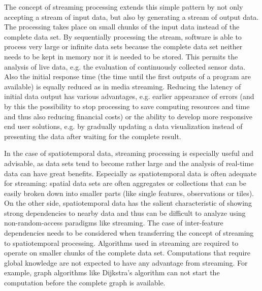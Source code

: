 	The concept of streaming processing extends this simple pattern by not only accepting a stream of input data, but also by generating a stream of output data. The processing takes place on small chunks of the input data instead of the complete data set. By sequentially processing the stream, software is able to process very large or infinite data sets because the complete data set neither needs to be kept in memory nor it is needed to be stored. This permits the analysis of live data, e.g. the evaluation of continuously collected sensor data. Also the initial response time (the time until the first outputs of a program are available) is equally reduced as in media streaming. Reducing the latency of initial data output has various advantages, e.g. earlier appearance of errors (and by this the possibility to stop processing to save computing resources and time and thus also reducing financial costs) or the ability to develop more responsive end user solutions, e.g. by gradually updating a data visualization instead of presenting the data after waiting for the complete result.

	In the case of spatiotemporal data, streaming processing is especially useful and advisable, as data sets tend to become rather large and the analysis of real-time data can have great benefits. Especially as spatiotemporal data is often adequate for streaming: spatial data sets are often aggregates or collections that can be easily broken down into smaller parts (like single features, observations or tiles). On the other side, spatiotemporal data has the salient characteristic of showing strong dependencies to nearby data and thus can be difficult to analyze using non-random-access paradigms like streaming. The case of inter-feature dependencies needs to be considered when transferring the concept of streaming to spatiotemporal processing. Algorithms used in streaming are required to operate on smaller chunks of the complete data set. Computations that require global knowledge are not expected to have any advantage from streaming. For example, graph algorithms like Dijkstra's algorithm \citep{dijkstra} can not start the computation before the complete graph is available.

